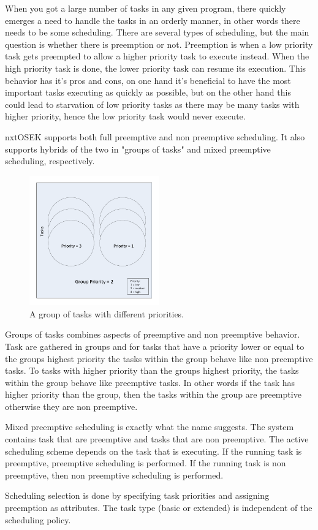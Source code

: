 When you got a large number of tasks in any given program, there quickly emerges a need to handle the tasks in an orderly manner, in other words there needs to be some scheduling. There are several types of scheduling, but the main question is whether there is preemption or not. Preemption is when a low priority task gets preempted to allow a higher priority task to execute instead. When the high priority task is done, the lower priority task can resume its execution. This behavior has it's pros and cons, on one hand it's beneficial to have the most important tasks executing as quickly as possible, but on the other hand this could lead to starvation of low priority tasks as there may be many tasks with higher priority, hence the low priority task would never execute. 

nxtOSEK supports both full preemptive and non preemptive scheduling. It also supports hybrids of the two in "groups of tasks" and mixed preemptive scheduling, respectively.

\begin{figure}[hptb]
  \centering
    \includegraphics[width= 0.5\textwidth]{img/task_group.pdf}
  \caption{A group of tasks with different priorities.}
  \label{task_group}
\end{figure}

Groups of tasks combines aspects of preemptive and non preemptive behavior. Task are gathered in groups and for tasks that have a priority lower or equal to the groups highest priority the tasks within the group behave like non preemptive tasks. To tasks with higher priority than the groups highest priority, the tasks within the group behave like preemptive tasks. In other words if the task has higher priority than the group, then the tasks within the group are preemptive otherwise they are non preemptive.

Mixed preemptive scheduling is exactly what the name suggests. The system contains task that are preemptive and tasks that are non preemptive. The active scheduling scheme depends on the task that is executing. If the running task is preemptive, preemptive scheduling is performed. If the running task is non preemptive, then non preemptive scheduling is performed. 

Scheduling selection is done by specifying task priorities and assigning preemption as attributes. The task type (basic or extended) is independent of the scheduling policy. 
